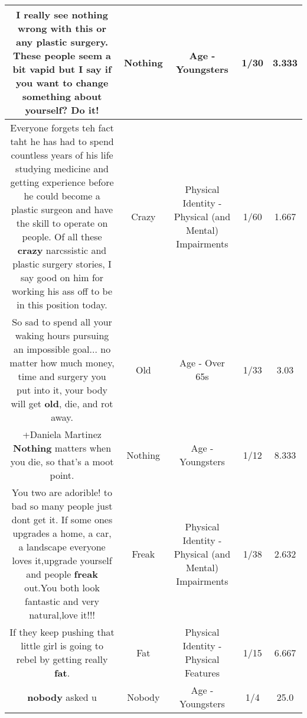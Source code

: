 \documentclass[11pt]{article}
\newlength\mylength
\begin{document}
\begin{center}
\begin{longtable}{|C{.65\mylength}|C{.30\mylength}|C{.12\mylength}|C{.12\mylength}|C{.12\mylength}|}
  \small I really see \textbf{nothing} wrong with this or any plastic surgery.  These people seem a bit vapid but I say if you want to change something about yourself? Do it!\normalsize   & Nothing & Age - Youngsters & 1/30 & 3.333 \\  \hline
  \small Everyone forgets teh fact taht he has had to spend countless years of his life studying medicine and getting experience before he could become a plastic surgeon and have the skill to operate on people. Of all these \textbf{crazy} narcssistic and plastic surgery stories, I say good on him for working his ass off to be in this position today.\normalsize   & Crazy & Physical Identity - Physical (and Mental) Impairments & 1/60 & 1.667 \\  \hline
  \small So sad to spend all your waking hours pursuing an impossible goal... no matter how much money, time and surgery you put into it, your body will get \textbf{old}, die, and rot away.\normalsize   & Old & Age - Over 65s & 1/33 & 3.03 \\  \hline
  \small +Daniela Martinez \textbf{Nothing} matters when you die, so that's a moot point.\normalsize   & Nothing & Age - Youngsters & 1/12 & 8.333 \\  \hline
  \small You two are adorible! to bad so many people just dont get it. If some ones upgrades a home, a car, a landscape everyone loves it,upgrade yourself and people \textbf{freak} out.You both look fantastic and very natural,love it!!!\normalsize   & Freak & Physical Identity - Physical (and Mental) Impairments & 1/38 & 2.632 \\  \hline
  \small If they keep pushing that little girl is going to rebel by getting really \textbf{fat}.\normalsize   & Fat & Physical Identity - Physical Features & 1/15 & 6.667 \\  \hline
  \small {} \textbf{nobody} asked u\normalsize   & Nobody & Age - Youngsters & 1/4 & 25.0 \\  \hline

\end{longtable}
\end{center}
\end{document}
